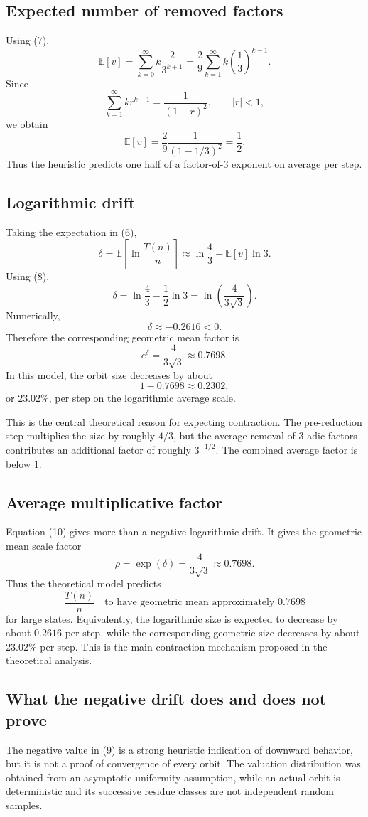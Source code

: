 \documentclass[11pt]{article}
\begin{document}
\subsection{Expected number of removed factors}
Using (7),
\[
\mathbb E[v]
=\sum_{k=0}^{\infty}k\frac{2}{3^{k+1}}
=\frac{2}{9}\sum_{k=1}^{\infty}k\left(\frac13\right)^{k-1}.
\]
Since
\[
\sum_{k=1}^{\infty}kr^{k-1}=\frac{1}{(1-r)^2},
\qquad |r|<1,
\]
we obtain
\[
\mathbb E[v]
=\frac{2}{9}\frac{1}{(1-1/3)^2}
=\frac12.
\tag{8}
\]
Thus the heuristic predicts one half of a factor-of-$3$ exponent on average per step.

\subsection{Logarithmic drift}
Taking the expectation in (6),
\[
\delta
=\mathbb E\left[\ln\frac{T(n)}n\right]
\approx \ln\frac43-\mathbb E[v]\ln3.
\]
Using (8),
\[
\boxed{\delta=\ln\frac43-\frac12\ln3
=\ln\left(\frac4{3\sqrt3}\right)}.
\tag{9}
\]
Numerically,
\[
\delta\approx-0.2616<0.
\]
Therefore the corresponding geometric mean factor is
\[
e^\delta=\frac4{3\sqrt3}\approx0.7698.
\tag{10}
\]
In this model, the orbit size decreases by about
\[
1-0.7698\approx0.2302,
\]
or $23.02\%$, per step on the logarithmic average scale.

This is the central theoretical reason for expecting contraction. The pre-reduction step multiplies the size by roughly $4/3$, but the average removal of $3$-adic factors contributes an additional factor of roughly $3^{-1/2}$. The combined average factor is below $1$.

\subsection{Average multiplicative factor}
Equation (10) gives more than a negative logarithmic drift. It gives the geometric mean scale factor
\[
\rho=\exp(\delta)=\frac{4}{3\sqrt3}\approx0.7698.
\tag{14}
\]
Thus the theoretical model predicts
\[
\frac{T(n)}{n}\quad\text{to have geometric mean approximately }0.7698
\]
for large states. Equivalently, the logarithmic size is expected to decrease by about $0.2616$ per step, while the corresponding geometric size decreases by about $23.02\%$ per step. This is the main contraction mechanism proposed in the theoretical analysis.

\subsection{What the negative drift does and does not prove}
The negative value in (9) is a strong heuristic indication of downward behavior, but it is not a proof of convergence of every orbit. The valuation distribution was obtained from an asymptotic uniformity assumption, while an actual orbit is deterministic and its successive residue classes are not independent random samples.
\end{document}
